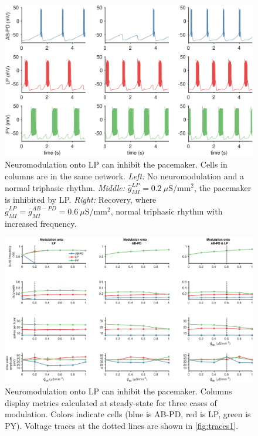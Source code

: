 \FloatBarrier

\begin{figure}[t]
	\centering
	\includegraphics[width=1.0\linewidth]{gfx/all-modulation/traces1}
	\caption[Modulation onto LP inhibits the pacemaker (traces)]{Neuromodulation onto \acs{LP} can inhibit the pacemaker. Cells in columns are in the same network. \textit{Left:} No neuromodulation and a normal triphasic rhythm. \textit{Middle:} $\bar{g}_{MI}^{LP} = 0.2~\mu \mathrm{S/mm^2}$, the pacemaker is inhibited by \acs{LP}. \textit{Right:} Recovery, where $\bar{g}_{MI}^{LP} = \bar{g}_{MI}^{AB-PD} = 0.6~\mu \mathrm{S/mm^2}$, normal triphasic rhythm with increased frequency.}
	\label{fig:traces1}
\end{figure}

\begin{figure}[b]
	\centering
	\includegraphics[width=1.0\linewidth]{gfx/all-modulation/metrics1}
	\caption[Modulation onto LP inhibits the pacemaker (metrics)]{Neuromodulation onto \acs{LP} can inhibit the pacemaker. Columns display metrics calculated at steady-state for three cases of modulation. Colors indicate cells (blue is \acs{AB}-\acs{PD}, red is \acs{LP}, green is \acs{PY}). Voltage traces at the dotted lines are shown in \autoref{fig:traces1}.}
	\label{fig:metrics1}
\end{figure}

